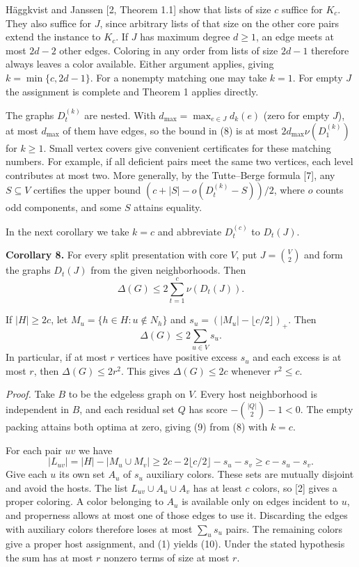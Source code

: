 \documentclass[english,11pt,a4paper]{article}
\newcounter{none}
\begin{document}
Häggkvist and Janssen {[}2, Theorem 1.1{]} show that lists of size \(c\) suffice for \(K_c\). They also suffice for \(J\), since arbitrary lists of that size on the other core pairs extend the instance to \(K_c\). If \(J\) has maximum degree \(d\ge1\), an edge meets at most \(2d-2\) other edges. Coloring in any order from lists of size \(2d-1\) therefore always leaves a color available. Either argument applies, giving \(k=\min\{c,2d-1\}\). For a nonempty matching one may take \(k=1\). For empty \(J\) the assignment is complete and Theorem 1 applies directly.

The graphs \(D_t^{(k)}\) are nested. With \(d_{\max}=\max_{e\in J}d_k(e)\) (zero for empty \(J\)), at most \(d_{\max}\) of them have edges, so the bound in (8) is at most \(2d_{\max}\nu(D_1^{(k)})\) for \(k\ge1\). Small vertex covers give convenient certificates for these matching numbers. For example, if all deficient pairs meet the same two vertices, each level contributes at most two. More generally, by the Tutte--Berge formula {[}7{]}, any \(S\subseteq V\) certifies the upper bound \((c+|S|-o(D_t^{(k)}-S))/2\), where \(o\) counts odd components, and some \(S\) attains equality.

In the next corollary we take \(k=c\) and abbreviate \(D_t^{(c)}\) to \(D_t(J)\).

\textbf{Corollary 8.} For every split presentation with core \(V\), put \(J=\binom{V}{2}\) and form the graphs \(D_t(J)\) from the given neighborhoods. Then
\[
\Delta(G)\le 2\sum_{t=1}^{c}\nu(D_t(J)). \tag{9}
\]

If \(|H|\ge2c\), let \(M_u=\{h\in H:u\notin N_h\}\) and \(s_u=(|M_u|-\lfloor c/2\rfloor)_+\). Then \[
\Delta(G)\le 2\sum_{u\in V}s_u. \tag{10}
\] In particular, if at most \(r\) vertices have positive excess \(s_u\) and each excess is at most \(r\), then \(\Delta(G)\le2r^2\). This gives \(\Delta(G)\le2c\) whenever \(r^2\le c\).

\emph{Proof.} Take \(B\) to be the edgeless graph on \(V\). Every host neighborhood is independent in \(B\), and each residual set \(Q\) has score \(-\binom{|Q|}{2}-1<0\). The empty packing attains both optima at zero, giving (9) from (8) with \(k=c\).

For each pair \(uv\) we have \[
|L_{uv}|=|H|-|M_u\cup M_v|\ge 2c-2\lfloor c/2\rfloor-s_u-s_v\ge c-s_u-s_v .
\] Give each \(u\) its own set \(A_u\) of \(s_u\) auxiliary colors. These sets are mutually disjoint and avoid the hosts. The list \(L_{uv}\cup A_u\cup A_v\) has at least \(c\) colors, so {[}2{]} gives a proper coloring. A color belonging to \(A_u\) is available only on edges incident to \(u\), and properness allows at most one of those edges to use it. Discarding the edges with auxiliary colors therefore loses at most \(\sum_u s_u\) pairs. The remaining colors give a proper host assignment, and (1) yields (10). Under the stated hypothesis the sum has at most \(r\) nonzero terms of size at most \(r\).
\end{document}
